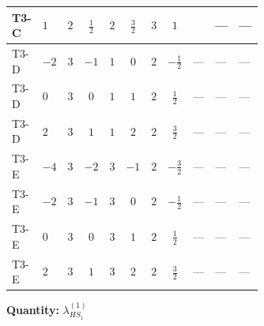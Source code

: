 \documentclass[8pt]{article}
\begin{document}
\begin{landscape}
\begin{longtable}{@{}llcccccc >{\raggedright\arraybackslash}p{0.21\linewidth} >{\raggedright\arraybackslash}p{0.21\linewidth} >{\raggedright\arraybackslash}p{0.21\linewidth}@{}}
\midrule
T3-C & $1$ & $2$ & $\frac{1}{2}$ & $2$ & $\frac{3}{2}$ & $3$ & $1$ & \scriptsize\adjustbox{max width=\linewidth}{$\begin{gathered} +\frac{3 {\lambda_{HS_1}^{(A)}}^2}{4}\end{gathered}$} & --- & --- \\
\midrule
T3-D & $-2$ & $3$ & $-1$ & $1$ & $0$ & $2$ & $-\frac{1}{2}$ & --- & --- & --- \\
\midrule
T3-D & $0$ & $3$ & $0$ & $1$ & $1$ & $2$ & $\frac{1}{2}$ & --- & --- & --- \\
\midrule
T3-D & $2$ & $3$ & $1$ & $1$ & $2$ & $2$ & $\frac{3}{2}$ & --- & --- & --- \\
\midrule
T3-E & $-4$ & $3$ & $-2$ & $3$ & $-1$ & $2$ & $-\frac{3}{2}$ & --- & --- & --- \\
\midrule
T3-E & $-2$ & $3$ & $-1$ & $3$ & $0$ & $2$ & $-\frac{1}{2}$ & --- & --- & --- \\
\midrule
T3-E & $0$ & $3$ & $0$ & $3$ & $1$ & $2$ & $\frac{1}{2}$ & --- & --- & --- \\
\midrule
T3-E & $2$ & $3$ & $1$ & $3$ & $2$ & $2$ & $\frac{3}{2}$ & --- & --- & --- \\
\midrule
\bottomrule
\end{longtable}
\clearpage
\noindent\textbf{Quantity: }$\lambda_{HS_1}^{(1)}$\par\smallskip

\end{landscape}
\end{document}
